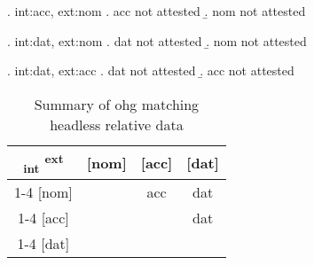   \ex. \ac{int}:\ac{acc}, \ac{ext}:\ac{nom}
  \a. \ac{acc} not attested
  \b. \ac{nom} not attested

 \ex. \ac{int}:\ac{dat}, \ac{ext}:\ac{nom}
 \a. \ac{dat} not attested
 \b. \ac{nom} not attested

 \ex. \ac{int}:\ac{dat}, \ac{ext}:\ac{acc}
 \a. \ac{dat} not attested
 \b. \ac{acc} not attested




 \begin{table}[H]
   \center
   \caption {Summary of \ac{ohg} matching headless relative data}
 		\begin{tabular}{c|c|c|c}
 		  \toprule
 			\textsubscript{\ac{int}} \textsuperscript{\ac{ext}}
 		        & [\ac{nom}]
 		        & [\ac{acc}]
 		        & [\ac{dat}]
 		        \\ \cmidrule{1-4}
 		    [\ac{nom}]
 		        &
 		        & \ac{acc}
 		        & \ac{dat}
 		        \\ \cmidrule{1-4}
 		    [\ac{acc}]
 		        &
 		        &
 		        & \ac{dat}
 		        \\ \cmidrule{1-4}
 		    [\ac{dat}]
 		        &
 		        &
 		        &
 		        \\
 		  \bottomrule
 		\end{tabular}
 \end{table}


